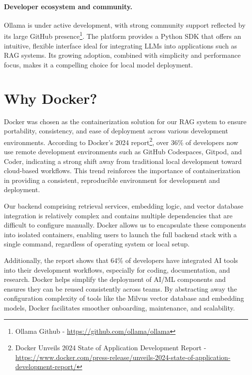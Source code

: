 \vspace{0.5em}
\paragraph*{Developer ecosystem and community.} Ollama is under active development, with strong community support reflected by its large GitHub presence\footnote{Ollama Github - \url{https://github.com/ollama/ollama}}. The platform provides a Python SDK that offers an intuitive, flexible interface ideal for integrating LLMs into applications such as RAG systems. Its growing adoption, combined with simplicity and performance focus, makes it a compelling choice for local model deployment.

\section{Why Docker?}

Docker was chosen as the containerization solution for our RAG system to ensure portability, consistency, and ease of deployment across various development environments. According to Docker’s 2024 report\footnote{Docker Unveils 2024 State of Application Development Report - \url{https://www.docker.com/press-release/unveils-2024-state-of-application-development-report/}}, over 36\% of developers now use remote development environments such as GitHub Codespaces, Gitpod, and Coder, indicating a strong shift away from traditional local development toward cloud-based workflows. This trend reinforces the importance of containerization in providing a consistent, reproducible environment for development and deployment.
		
Our backend comprising retrieval services, embedding logic, and vector database integration is relatively complex and contains multiple dependencies that are difficult to configure manually. Docker allows us to encapsulate these components into isolated containers, enabling users to launch the full backend stack with a single command, regardless of operating system or local setup.
		
Additionally, the report shows that 64\% of developers have integrated AI tools into their development workflows, especially for coding, documentation, and research. Docker helps simplify the deployment of AI/ML components and ensures they can be reused consistently across teams. By abstracting away the configuration complexity of tools like the Milvus vector database and embedding models, Docker facilitates smoother onboarding, maintenance, and scalability.
		
